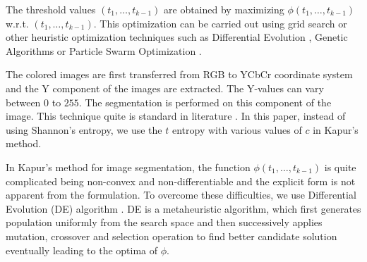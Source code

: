 \documentclass{article}
\begin{document}
The threshold values $(t_1,\dots, t_{k-1})$ are obtained by maximizing  $\phi(t_1,\dots, t_{k-1})$ w.r.t. $(t_1,\dots, t_{k-1})$. This optimization can be carried out using grid search or other heuristic optimization techniques such as Differential Evolution \citep{storn1997differential}, Genetic Algorithms \citep{mitchell1998introduction} or Particle Swarm Optimization \citep{eberhart1995new}.
\par
The colored images are first transferred from RGB to YCbCr coordinate system \citep{gonzalez2002digital} and the Y component of the images are extracted. The Y-values can vary between $0$ to $255$. The segmentation is performed on this component of the image. This technique quite is standard in literature \citep{sarkar2015multilevel,sarkar2011differential}. %
In this paper, instead of using Shannon's entropy, we use the $t$ entropy with various values of $c$ in Kapur's method.
\par
In Kapur's method for image segmentation, the function $\phi(t_1,\dots,t_{k-1})$ is quite complicated being non-convex and non-differentiable and the explicit form is not apparent from the formulation. To overcome these difficulties, we use Differential Evolution (DE) algorithm \citep{sarkar2011differential}. DE is  a metaheuristic algorithm, %
which first generates population uniformly from the search space and then successively applies mutation, crossover and selection operation to find better candidate solution eventually leading to the optima of $\phi$.
\par
\end{document}
